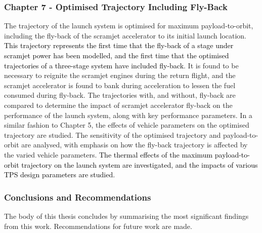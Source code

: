  
      
      \subsubsection*{Chapter 7 - Optimised Trajectory Including Fly-Back}
      
      The trajectory of the launch system is optimised for maximum payload-to-orbit, including the fly-back of the scramjet accelerator to its initial launch location. \textcolor{black}{This trajectory represents the first time that the fly-back of a stage under scramjet power has been modelled, and the first time that the optimised trajectories of a three-stage system have included fly-back}. 
      It is found to be necessary to reignite the scramjet engines during the return flight, and the scramjet accelerator is found to bank during acceleration to lessen the fuel consumed during fly-back.
      The trajectories with, and without, fly-back are compared to determine the impact of scramjet accelerator fly-back on the performance of the launch system, along with key performance parameters. 
      In a similar fashion to Chapter 5, the effects of vehicle parameters on the optimised trajectory are studied. The sensitivity of the optimised trajectory and payload-to-orbit are analysed, with emphasis on how the fly-back trajectory is affected by the varied vehicle parameters.
      \textcolor{black}{The thermal effects of the maximum payload-to-orbit trajectory on the launch system are investigated, and the impacts of various TPS design parameters are studied.}
     
      

    \subsubsection*{Conclusions and Recommendations}

      The body of this thesis concludes by summarising the most significant findings from this work. Recommendations for future work are made. 
      
      
      
